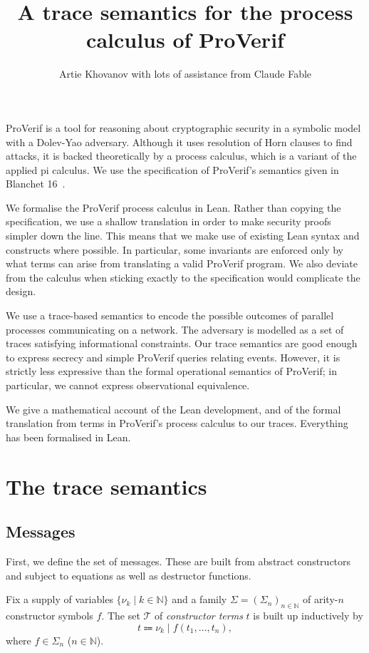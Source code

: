 \documentclass[11pt]{article}
\title{A trace semantics for the process calculus of ProVerif}
\author{Artie Khovanov with lots of assistance from Claude Fable}
\date{}
\theoremstyle{definition}
\theoremstyle{plain}
\theoremstyle{remark}
\newcommand{\N}{\mathbb{N}}
\begin{document}
\maketitle

ProVerif is a tool for reasoning about cryptographic security in a symbolic model with a Dolev-Yao adversary. Although it uses resolution of Horn clauses to find attacks, it is backed theoretically by a process calculus, which is a variant of the applied pi calculus. We use the specification of ProVerif's semantics given in Blanchet 16~\cite{BlanchetFnTPS16}.

We formalise the ProVerif process calculus in Lean. Rather than copying the specification, we use a shallow translation in order to make security proofs simpler down the line. This means that we make use of existing Lean syntax and constructs where possible. In particular, some invariants are enforced only by what terms can arise from translating a valid ProVerif program. We also deviate from the calculus when sticking exactly to the specification would complicate the design.

We use a trace-based semantics to encode the possible outcomes of parallel processes communicating on a network. The adversary is modelled as a set of traces satisfying informational constraints. Our trace semantics are good enough to express secrecy and simple ProVerif queries relating events. However, it is strictly less expressive than the formal operational semantics of ProVerif; in particular, we cannot express observational equivalence. 

We give a mathematical account of the Lean development, and of the formal translation from terms in ProVerif's process calculus to our traces. Everything has been formalised in Lean.

\section{The trace semantics}

\subsection{Messages}

First, we define the set of messages. These are built from abstract constructors and subject to equations as well as destructor functions.

Fix a supply of variables $\{\nu_k\mid k\in\N\}$ and a family $\Sigma=(\Sigma_n)_{n\in\N}$ of arity-$n$ constructor symbols $f$. The set $\mathcal{T}$ of \textit{constructor terms} $t$ is built up inductively by
\[
    t \Coloneqq \nu_k \mid f(t_1,\dots,t_n),
\]
where $f\in\Sigma_n$ ($n\in\N$).
\end{document}
